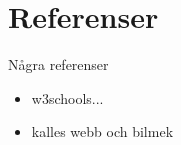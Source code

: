 \section{Referenser}
Några referenser

\begin{itemize}
  \item w3schools...

  \item kalles webb och bilmek
\end{itemize}
